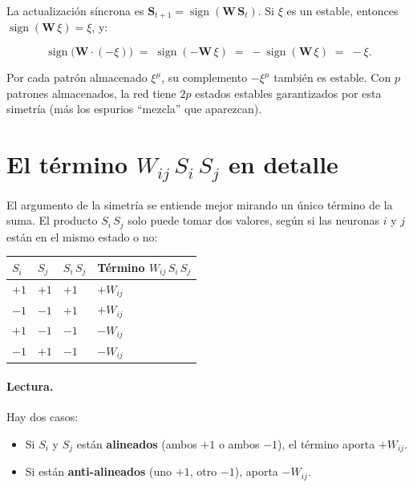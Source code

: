 \documentclass[11pt]{article}
\newcommand{\W}{\mathbf{W}}
\newcommand{\Smat}{\mathbf{S}}
\begin{document}
La actualización síncrona es $\Smat_{t+1} = \operatorname{sign}(\W\,\Smat_t)$. Si $\xi$ es un estable, entonces $\operatorname{sign}(\W\,\xi) = \xi$, y:

\[
\operatorname{sign}\bigl(\W \cdot (-\xi)\bigr) \;=\; \operatorname{sign}(-\W\,\xi) \;=\; -\operatorname{sign}(\W\,\xi) \;=\; -\xi.
\]

Por cada patrón almacenado $\xi^{\mu}$, su complemento $-\xi^{\mu}$ también es estable. Con $p$ patrones almacenados, la red tiene $2p$ estados estables garantizados por esta simetría (más los espurios “mezcla” que aparezcan).

\section*{El término $W_{ij}\, S_i\, S_j$ en detalle}

El argumento de la simetría se entiende mejor mirando un único término de la suma. El producto $S_i\,S_j$ solo puede tomar dos valores, según si las neuronas $i$ y $j$ están en el mismo estado o no:

\begin{center}
\renewcommand{\arraystretch}{1.3}
\begin{tabular}{>{\centering\arraybackslash}m{2.2cm} >{\centering\arraybackslash}m{2.2cm} >{\centering\arraybackslash}m{2.5cm} >{\centering\arraybackslash}m{4cm}}
\toprule
$S_i$ & $S_j$ & $S_i\,S_j$ & Término $W_{ij}\,S_i\,S_j$ \\
\midrule
$+1$ & $+1$ & $+1$ & $+W_{ij}$ \\
$-1$ & $-1$ & $+1$ & $+W_{ij}$ \\
\midrule
$+1$ & $-1$ & $-1$ & $-W_{ij}$ \\
$-1$ & $+1$ & $-1$ & $-W_{ij}$ \\
\bottomrule
\end{tabular}
\end{center}

\paragraph{Lectura.} Hay dos casos:

\begin{itemize}
\item Si $S_i$ y $S_j$ están \textcolor{verde}{\textbf{alineados}} (ambos $+1$ o ambos $-1$), el término aporta $+W_{ij}$.
\item Si están \textcolor{rojo}{\textbf{anti-alineados}} (uno $+1$, otro $-1$), aporta $-W_{ij}$.
\end{itemize}
\end{document}
